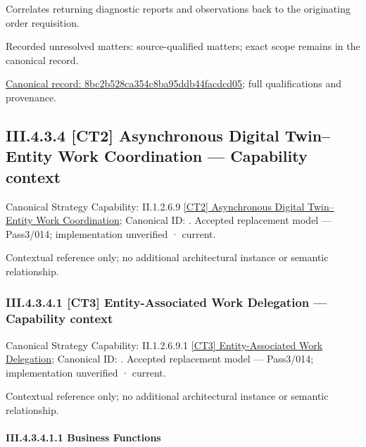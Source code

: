 Correlates returning diagnostic reports and observations back to the originating order requisition.


{\small Recorded unresolved matters: source-qualified matters; exact scope remains in the canonical record.}\par
{\footnotesize \href{../../../../continuum/business/business-function/8bc2b528ca354c8ba95ddb44facdcd05.md}{Canonical record: 8bc2b528ca354c8ba95ddb44facdcd05}; full qualifications and provenance.}\par
\subsection*{III.4.3.4 [CT2] Asynchronous Digital Twin–Entity Work Coordination — Capability context}
\label{navigation:III.4.3.4}

{\small Canonical Strategy Capability: II.1.2.6.9 \hyperref[element:7a97e45e72cf468983b6ba5c79217503]{[CT2] Asynchronous Digital Twin–Entity Work Coordination}; Canonical ID: \texttt{}. Accepted replacement model — Pass3/014; implementation unverified · current.}\par
Contextual reference only; no additional architectural instance or semantic relationship.\par
\subsubsection*{III.4.3.4.1 [CT3] Entity-Associated Work Delegation — Capability context}
\label{navigation:III.4.3.4.1}

{\small Canonical Strategy Capability: II.1.2.6.9.1 \hyperref[element:54b2f346a08c49a98ed9b3d64b2f877e]{[CT3] Entity-Associated Work Delegation}; Canonical ID: \texttt{}. Accepted replacement model — Pass3/014; implementation unverified · current.}\par
Contextual reference only; no additional architectural instance or semantic relationship.\par
\paragraph*{III.4.3.4.1.1 Business Functions}
\label{navigation:III.4.3.4.1.1}

